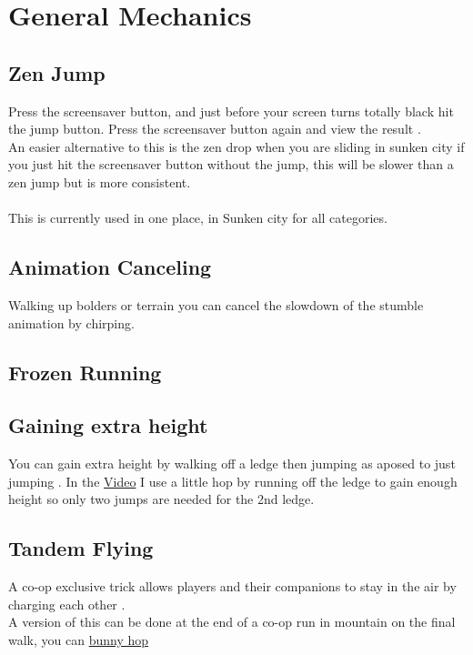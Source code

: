 \section{General Mechanics}

\subsection*{Zen Jump}
Press the screensaver button, and just before your screen turns totally black hit the jump button. Press
the screensaver button again and view the result \autocite{zenJump_Wiki}.\\
An easier alternative to this is the zen drop \autocite{zenJumpDrop_Wiki} when you are sliding in sunken city if you just hit the screensaver button
without the jump, this will be slower than a zen jump but is more consistent.\\ 
\\
This is currently used in one place, in Sunken city for all categories. 
\subsection*{Animation Canceling}
Walking up bolders or terrain you can cancel the slowdown of the stumble animation by chirping. 
\subsection*{Frozen Running}

\subsection*{Gaining extra height}
You can gain extra height by walking off a ledge then jumping as aposed to just jumping \autocite{charybdis2_2022}. In 
the \href{https://youtu.be/I1JgGJzllMw}{Video} I use a little hop by running off the ledge to gain enough height 
so only two jumps are needed for the 2nd ledge. 

\subsection*{Tandem Flying}
A co-op exclusive trick allows players and their companions to stay in the air by charging each other \autocite{Tandemflying}.\\
A version of this can be done at the end of a co-op run in mountain on the final walk, you can \href{https://www.twitch.tv/charybdis2/clip/SmoggySmilingKoupreyShadyLulu}{bunny hop}

